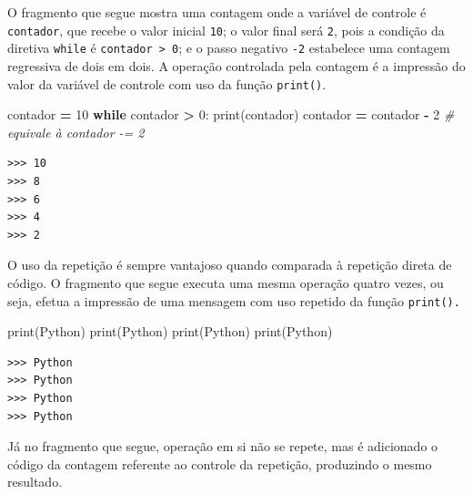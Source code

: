 \documentclass[
]{book}
\newenvironment{Shaded}{\begin{snugshade}}{\end{snugshade}}
\newcommand{\BuiltInTok}[1]{#1}
\newcommand{\CommentTok}[1]{\textcolor[rgb]{0.56,0.35,0.01}{\textit{#1}}}
\newcommand{\ControlFlowTok}[1]{\textcolor[rgb]{0.13,0.29,0.53}{\textbf{#1}}}
\newcommand{\DecValTok}[1]{\textcolor[rgb]{0.00,0.00,0.81}{#1}}
\newcommand{\NormalTok}[1]{#1}
\newcommand{\OperatorTok}[1]{\textcolor[rgb]{0.81,0.36,0.00}{\textbf{#1}}}
\newcommand{\StringTok}[1]{\textcolor[rgb]{0.31,0.60,0.02}{#1}}
\begin{document}
O fragmento que segue mostra uma contagem onde a variável de controle é \texttt{contador}, que recebe o valor inicial \texttt{10}; o valor final será \texttt{2}, pois a condição da diretiva \texttt{while} é \texttt{contador\ \textgreater{}\ 0}; e o passo negativo \texttt{-2} estabelece uma contagem regressiva de dois em dois. A operação controlada pela contagem é a impressão do valor da variável de controle com uso da função \texttt{print()}.

\begin{Shaded}
\begin{Highlighting}[]
\NormalTok{contador }\OperatorTok{=} \DecValTok{10}
\ControlFlowTok{while}\NormalTok{ contador }\OperatorTok{\textgreater{}} \DecValTok{0}\NormalTok{:}
    \BuiltInTok{print}\NormalTok{(contador)}
\NormalTok{    contador }\OperatorTok{=}\NormalTok{ contador }\OperatorTok{{-}} \DecValTok{2} \CommentTok{\# equivale à contador {-}= 2}
\end{Highlighting}
\end{Shaded}

\begin{verbatim}
>>> 10
>>> 8
>>> 6
>>> 4
>>> 2
\end{verbatim}

O uso da repetição é sempre vantajoso quando comparada à repetição direta de código. O fragmento que segue executa uma mesma operação quatro vezes, ou seja, efetua a impressão de uma mensagem com uso repetido da função \texttt{print().}

\begin{Shaded}
\begin{Highlighting}[]
\BuiltInTok{print}\NormalTok{(}\StringTok{\textquotesingle{}Python\textquotesingle{}}\NormalTok{)}
\BuiltInTok{print}\NormalTok{(}\StringTok{\textquotesingle{}Python\textquotesingle{}}\NormalTok{)}
\BuiltInTok{print}\NormalTok{(}\StringTok{\textquotesingle{}Python\textquotesingle{}}\NormalTok{)}
\BuiltInTok{print}\NormalTok{(}\StringTok{\textquotesingle{}Python\textquotesingle{}}\NormalTok{)}
\end{Highlighting}
\end{Shaded}

\begin{verbatim}
>>> Python
>>> Python
>>> Python
>>> Python
\end{verbatim}

Já no fragmento que segue, operação em si não se repete, mas é adicionado o código da contagem referente ao controle da repetição, produzindo o mesmo resultado.
\end{document}
